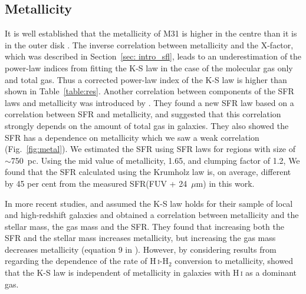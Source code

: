 \subsection{Metallicity}
\label{sec:fittingmetal}
It is well established that the metallicity of M31 is higher in the centre than it is in the outer disk  \citep[e.g.][]{Draine14}. The inverse correlation between metallicity and the X-factor, which was described in Section~\ref{sec: intro_sfl}, leads to an underestimation of the power-law indices from fitting the K-S law in the case of the molecular gas only and total gas. 
Thus a corrected power-law index of the K-S law is higher than shown in Table~\ref{table:res}. Another correlation between components of the SFR laws and metallicity was introduced by \citet{Krumholz09}. 
They found a new SFR law based on a correlation between SFR and metallicity, and suggested that this correlation strongly depends on the amount of total gas in galaxies. They also showed the SFR has a dependence on metallicity which we saw a weak correlation (Fig.~\ref{fig:metal}).
 We estimated the SFR using \citet{Krumholz09} SFR laws for regions with size of $\sim$750~pc.
Using the mid value of metallicity, 1.65, and clumping factor of 1.2, We found that the SFR calculated using the Krumholz law is, on average, different by 45 per cent from the measured SFR(FUV + 24~$\mu$m) in this work. 

In more recent studies, \citet{Mannucci10} and \citet{Lilly13} assumed the K-S law holds for their sample of local and high-redshift galaxies and obtained a correlation between metallicity and the stellar mass, the gas mass and the SFR. 
They found that increasing both the SFR and the stellar mass increases metallicity, but increasing the gas mass decreases metallicity (equation 9 in \citep{Mannucci10}). 
However, by considering results from \citet{wong13} regarding the dependence of the rate of H\,{\textsc i}-H$_2$ conversion to metallicity, \citet{Roychowdhury15} showed that the K-S law is independent of metallicity in galaxies with H\,{\textsc i} as a dominant gas. 

